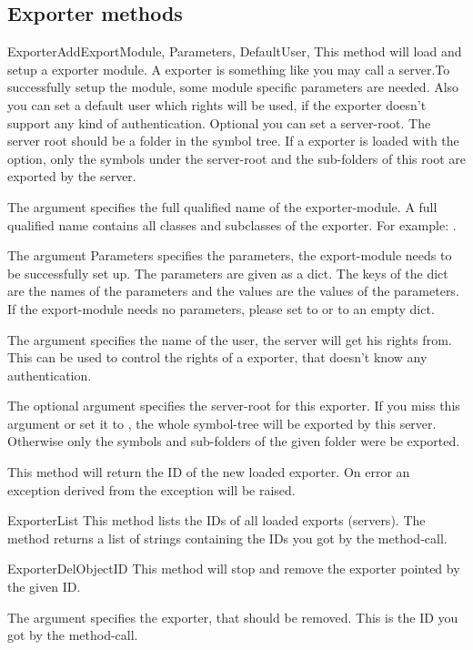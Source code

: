 \subsection{Exporter methods}
\begin{methoddesc}[Core]{ExporterAdd}{ExportModule, Parameters, DefaultUser, }
This method will load and setup a exporter module. A exporter is something like
you may call a server.To successfully setup the module, some module specific 
parameters are needed. Also you can set a default user which rights will be 
used, if the exporter doesn't support any kind of authentication. Optional you can set 
a server-root. The server root should be a folder in the symbol tree. If a exporter 
is loaded with the  option, only the symbols under the server-root 
and the sub-folders of this root are exported by the server.

The argument  specifies the full qualified name of the 
exporter-module. A full qualified name contains all classes and subclasses of 
the exporter. For example: . 

The argument Parameters specifies the parameters, the export-module needs to be
successfully set up. The parameters are given as a dict. The keys of the dict
are the names of the parameters and the values are the values of the 
parameters. If the export-module needs no parameters, please set 
 to  or to an empty dict.

The argument  specifies the name of the user, the server will 
get his rights from. This can be used to control the rights of a exporter,
that doesn't know any authentication.

The optional argument  specifies the server-root for this exporter. 
If you miss this argument or set it to , the whole symbol-tree
will be exported by this server. Otherwise only the symbols and sub-folders of
the given folder were be exported.

This method will return the ID of the new loaded exporter. On error an 
exception derived from the  exception will be raised.
\end{methoddesc}


\begin{methoddesc}[Core]{ExporterList}{}
This method lists the IDs of all loaded exports (servers). The method returns
a list of strings containing the IDs you got by the 
method-call. 
\end{methoddesc}


\begin{methoddesc}[Core]{ExporterDel}{ObjectID}
This method will stop and remove the exporter pointed by the given ID. 

The argument  specifies the exporter, that should be removed.
This is the ID you got by the  method-call.

\end{methoddesc}
